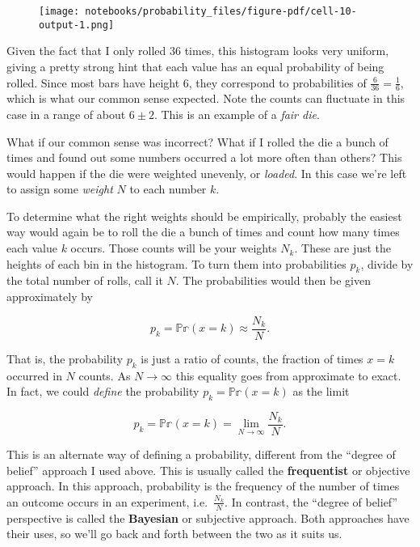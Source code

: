 \documentclass[
  letterpaper,
  DIV=11,
  numbers=noendperiod]{scrreprt}
\begin{document}
\begin{figure}[H]

{\centering \texttt{[image: notebooks/probability\_files/figure-pdf/cell-10-output-1.png]}

}

\end{figure}

Given the fact that I only rolled \(36\) times, this histogram looks
very uniform, giving a pretty strong hint that each value has an equal
probability of being rolled. Since most bars have height \(6\), they
correspond to probabilities of \(\frac{6}{36}=\frac{1}{6}\), which is
what our common sense expected. Note the counts can fluctuate in this
case in a range of about \(6 \pm 2\). This is an example of a \emph{fair
die}.

What if our common sense was incorrect? What if I rolled the die a bunch
of times and found out some numbers occurred a lot more often than
others? This would happen if the die were weighted unevenly, or
\emph{loaded}. In this case we're left to assign some \emph{weight}
\(N\) to each number \(k\).

To determine what the right weights should be empirically, probably the
easiest way would again be to roll the die a bunch of times and count
how many times each value \(k\) occurs. Those counts will be your
weights \(N_k\). These are just the heights of each bin in the
histogram. To turn them into probabilities \(p_k\), divide by the total
number of rolls, call it \(N\). The probabilities would then be given
approximately by

\[p_k = \mathbb{Pr}(x=k) \approx \frac{N_k}{N}.\]

That is, the probability \(p_k\) is just a ratio of counts, the fraction
of times \(x=k\) occurred in \(N\) counts. As \(N \rightarrow \infty\)
this equality goes from approximate to exact. In fact, we could
\emph{define} the probability \(p_k = \mathbb{Pr}(x=k)\) as the limit

\[p_k = \mathbb{Pr}(x=k) = \lim_{N \rightarrow \infty} \frac{N_k}{N}.\]

This is an alternate way of defining a probability, different from the
``degree of belief'' approach I used above. This is usually called the
\textbf{frequentist} or objective approach. In this approach,
probability is the frequency of the number of times an outcome occurs in
an experiment, i.e.~\(\frac{N_k}{N}\). In contrast, the ``degree of
belief'' perspective is called the \textbf{Bayesian} or subjective
approach. Both approaches have their uses, so we'll go back and forth
between the two as it suits us.
\end{document}

